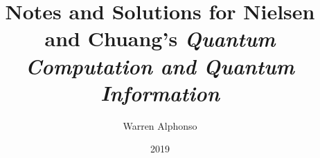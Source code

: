 \documentclass[9pt]{extbook}
\title{Notes and Solutions for Nielsen and Chuang's \textit{Quantum Computation and Quantum Information}}
\date{2019}
\author{Warren Alphonso}
\begin{document}
\frontmatter 
\let\cleardoublepage\clearpage 
\maketitle
\tableofcontents

\mainmatter




\end{document}
